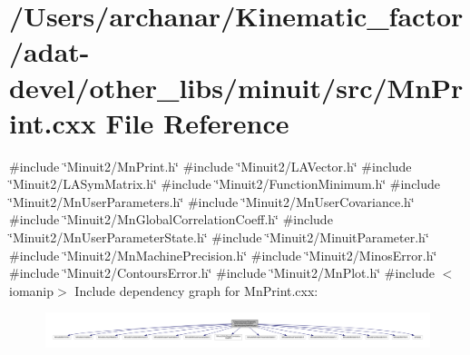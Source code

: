 \hypertarget{adat-devel_2other__libs_2minuit_2src_2MnPrint_8cxx}{}\section{/\+Users/archanar/\+Kinematic\+\_\+factor/adat-\/devel/other\+\_\+libs/minuit/src/\+Mn\+Print.cxx File Reference}
\label{adat-devel_2other__libs_2minuit_2src_2MnPrint_8cxx}
{\ttfamily \#include \char`\"{}Minuit2/\+Mn\+Print.\+h\char`\"{}}\newline
{\ttfamily \#include \char`\"{}Minuit2/\+L\+A\+Vector.\+h\char`\"{}}\newline
{\ttfamily \#include \char`\"{}Minuit2/\+L\+A\+Sym\+Matrix.\+h\char`\"{}}\newline
{\ttfamily \#include \char`\"{}Minuit2/\+Function\+Minimum.\+h\char`\"{}}\newline
{\ttfamily \#include \char`\"{}Minuit2/\+Mn\+User\+Parameters.\+h\char`\"{}}\newline
{\ttfamily \#include \char`\"{}Minuit2/\+Mn\+User\+Covariance.\+h\char`\"{}}\newline
{\ttfamily \#include \char`\"{}Minuit2/\+Mn\+Global\+Correlation\+Coeff.\+h\char`\"{}}\newline
{\ttfamily \#include \char`\"{}Minuit2/\+Mn\+User\+Parameter\+State.\+h\char`\"{}}\newline
{\ttfamily \#include \char`\"{}Minuit2/\+Minuit\+Parameter.\+h\char`\"{}}\newline
{\ttfamily \#include \char`\"{}Minuit2/\+Mn\+Machine\+Precision.\+h\char`\"{}}\newline
{\ttfamily \#include \char`\"{}Minuit2/\+Minos\+Error.\+h\char`\"{}}\newline
{\ttfamily \#include \char`\"{}Minuit2/\+Contours\+Error.\+h\char`\"{}}\newline
{\ttfamily \#include \char`\"{}Minuit2/\+Mn\+Plot.\+h\char`\"{}}\newline
{\ttfamily \#include $<$iomanip$>$}\newline
Include dependency graph for Mn\+Print.\+cxx\+:
\nopagebreak
\begin{figure}[H]
\begin{center}
\leavevmode
\includegraphics[width=350pt]{d6/dd4/adat-devel_2other__libs_2minuit_2src_2MnPrint_8cxx__incl}
\end{center}
\end{figure}
